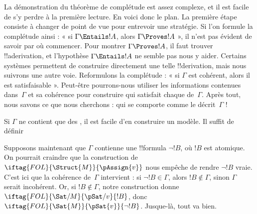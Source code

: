 \documentclass[../../../include/open-logic-section]{subfiles}
\begin{document}
      {}
      {}


La démonstration du théorème de complétude est assez complexe, et il
est facile de s'y perdre à la première lecture. En voici donc le
plan. La première étape consiste à changer de point de vue pour
entrevoir une stratégie. Si l'on formule la complétude ainsi : « si
$\Gamma\Entails !A$, alors $\Gamma\Proves !A$ », il n'est pas
évident de savoir par où commencer. Pour montrer
$\Gamma\Proves !A$, il faut trouver !!a{derivation}, et l'hypothèse
$\Gamma\Entails !A$ ne semble pas nous y aider. Certains systèmes
permettent de construire directement une telle !!{derivation}, mais
nous suivrons une autre voie. Reformulons la complétude : « si
$\Gamma$ est cohérent, alors il est satisfaisable ». Peut-être
pourrons-nous utiliser les informations contenues dans~$\Gamma$ et
sa cohérence pour construire
 qui satisfait chaque
 de~$\Gamma$. Après tout,
nous savons ce que nous cherchons :
 qui se comporte comme le
décrit~$\Gamma$ !{}

Si $\Gamma$ ne contient que des
,
il est facile d'en construire un modèle.
Il suffit de définir

Supposons maintenant que $\Gamma$ contienne une !!{formula}
$\lnot !B$, où $!B$ est atomique. On pourrait craindre que la
construction de $\iftag{FOL}{\Struct{M}}{\pAssign{v}}$ nous empêche
de rendre $\lnot !B$ vraie. C'est ici que la cohérence de~$\Gamma$
intervient : si $\lnot !B\in\Gamma$, alors $!B\notin\Gamma$,
sinon $\Gamma$ serait incohérent. Or, si $!B\notin\Gamma$, notre
construction donne
$\iftag{FOL}{\Sat/{M}}{\pSat/{v}}{!B}$, donc
$\iftag{FOL}{\Sat{M}}{\pSat{v}}{\lnot !B}$. Jusque-là, tout va bien.
\end{document}
